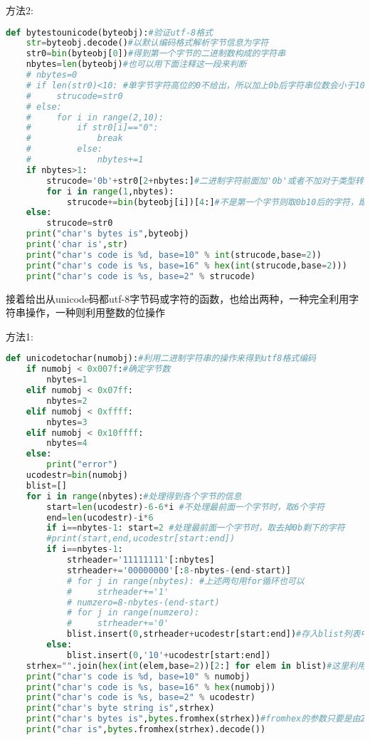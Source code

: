 \documentclass[twoside,11pt]{book}
\begin{document}
方法2:
\begin{lstlisting}[language=python]
def bytestounicode(byteobj):#验证utf-8格式
    str=byteobj.decode()#以默认编码格式解析字节信息为字符
    str0=bin(byteobj[0])#得到第一个字节的二进制数构成的字符串
    nbytes=len(byteobj)#也可以用下面注释这一段来判断
    # nbytes=0
    # if len(str0)<10: #单字节字符高位的0不给出，所以加上0b后字符串位数会小于10
    #     strucode=str0
    # else:
    #     for i in range(2,10):
    #         if str0[i]=="0":
    #             break
    #         else:
    #             nbytes+=1
    if nbytes>1:
        strucode='0b'+str0[2+nbytes:]#二进制字符前面加'0b'或者不加对于类型转换没有影响，这里为了显示效果加上它
        for i in range(1,nbytes):
            strucode+=bin(byteobj[i])[4:]#不是第一个字节则取0b10后的字符，即从第5个字符(第4个索引)开始
    else:
        strucode=str0
    print("char's bytes is",byteobj)
    print('char is',str)
    print("char's code is %d, base=10" % int(strucode,base=2))
    print("char's code is %s, base=16" % hex(int(strucode,base=2)))
    print("char's code is %s, base=2" % strucode)
\end{lstlisting}

接着给出从unicode码都utf-8字节码或字符的函数，也给出两种，一种完全利用字符串操作，一种则利用整数的位操作

方法1:
\begin{lstlisting}[language=python]
def unicodetochar(numobj):#利用二进制字符串的操作来得到utf8格式编码
    if numobj < 0x007f:#确定字节数
        nbytes=1
    elif numobj < 0x07ff:
        nbytes=2
    elif numobj < 0xffff:
        nbytes=3
    elif numobj < 0x10ffff:
        nbytes=4
    else:
        print("error")
    ucodestr=bin(numobj)
    blist=[]
    for i in range(nbytes):#处理得到各个字节的信息
        start=len(ucodestr)-6-6*i #不处理最前面一个字节时，取6个字符
        end=len(ucodestr)-i*6
        if i==nbytes-1: start=2 #处理最前面一个字节时，取去掉0b剩下的字符
        #print(start,end,ucodestr[start:end])
        if i==nbytes-1:
            strheader='11111111'[:nbytes]
            strheader+='00000000'[:8-nbytes-(end-start)]
            # for j in range(nbytes): #上述两句用for循环也可以
            #     strheader+='1'
            # numzero=8-nbytes-(end-start)
            # for j in range(numzero):
            #     strheader+='0'
            blist.insert(0,strheader+ucodestr[start:end])#存入blist列表中
        else:
            blist.insert(0,'10'+ucodestr[start:end])
    strhex="".join(hex(int(elem,base=2))[2:] for elem in blist)#这里利用了join方法连接字符串
    print("char's code is %d, base=10" % numobj)
    print("char's code is %s, base=16" % hex(numobj))
    print("char's code is %s, base=2" % ucodestr)
    print("char's byte string is",strhex)
    print("char's bytes is",bytes.fromhex(strhex))#fromhex的参数只要是由2个16 进制的数的字符串构成即可
    print("char is",bytes.fromhex(strhex).decode())
\end{lstlisting}
\end{document}
